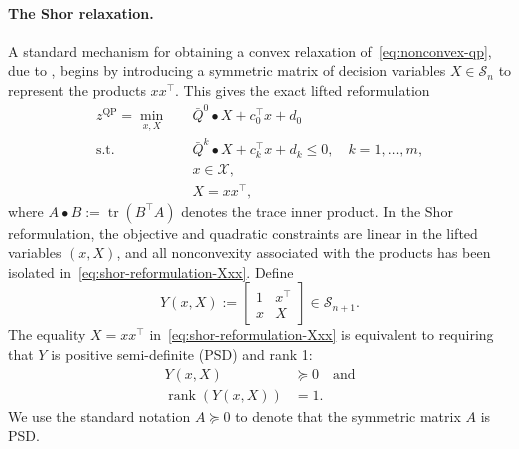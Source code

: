 \documentclass[twoside]{article}
\newcommand{\trace}{\operatorname{tr}}
\newcommand{\matip}[2]{#1 \bullet #2}
\newcommand{\citet}[1]{\cite{#1}}
\begin{document}
	\paragraph{The Shor relaxation.}
	A standard mechanism for obtaining a convex relaxation of~\eqref{eq:nonconvex-qp}, due to \citet{shor:90}, begins by introducing a symmetric matrix of decision variables $X\in\mathcal S_n$ to represent the products $xx^\top$. This gives the exact lifted reformulation
	\begin{subequations}
		\label{eq:shor-reformulation}
		\begin{align}
			z^{\mathrm{QP}} = \min_{x,X} \quad &\matip{\bar Q^0}{X} + c_0^\top x + d_0 \label{eq:shor-reformulation-obj}\\
			\text{s.t.} \quad & \matip{\bar Q^k}{X} + c_k^\top x + d_k \leq 0, \quad k=1,\ldots,m, \label{eq:shor-reformulation-cons}\\
			& x \in \mathcal X, \label{eq:shor-reformulation-X}\\
			& X = xx^\top, \label{eq:shor-reformulation-Xxx}
		\end{align}
	\end{subequations}
	where $A\bullet B:=\trace(B^\top A)$ denotes the trace inner product.
	In the Shor reformulation, the objective and quadratic constraints are linear in the lifted variables $(x,X)$, and all nonconvexity associated with the products has been isolated in~\eqref{eq:shor-reformulation-Xxx}. Define
	\begin{equation}
		\label{eq:Y-definition}
		Y(x,X):=
		\begin{bmatrix}
			1 & x^\top\\
			x & X
		\end{bmatrix}\in\mathcal S_{n+1}.
	\end{equation}
	The equality $X = xx^\top$ in~\eqref{eq:shor-reformulation-Xxx} is equivalent to requiring that $Y$ is positive semi-definite (PSD) and rank 1:
	\begin{subequations}
		\label{eq:rank-one-characterization}
		\begin{align}
			Y(x,X) &\succeq 0 \quad \text{and}\\
			\label{eq:nonconvex-rank-one}
			\operatorname{rank}(Y(x,X)) &= 1.
		\end{align}
	\end{subequations}
	We use the standard notation $A \succeq 0$ to denote that the symmetric matrix $A$ is PSD.
	
\end{document}
